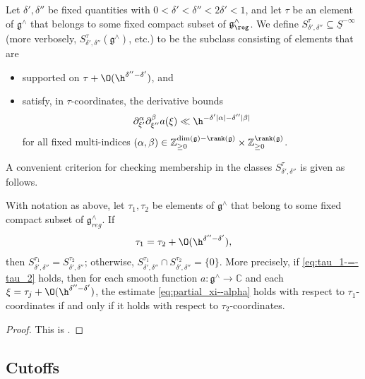 Let $\delta ', \delta ''$ be fixed quantities with $0 < \delta ' < \delta '' < 2 \delta ' < 1$, and let $\tau$ be an element of $\mathfrak{g}^\wedge$ that belongs to some fixed compact subset of $\mathfrak{g}^\wedge_{\reg}$.  We define $S^{\tau}_{\delta ', \delta ''} \subseteq \underline{S}^{-\infty}$ (more verbosely, $S_{\delta ', \delta ''}^{\tau}(\mathfrak{g}^\wedge)$, etc.) to be the subclass consisting of elements that are   
\begin{itemize}
\item supported on $\tau + \O(\h^{ \delta '' - \delta '})$, and
\item satisfy, in $\tau$-coordinates, the derivative bounds
  \begin{equation}\label{eq:partial_xi--alpha}
    \partial_{\xi '} ^{\alpha } \partial_{\xi ''} ^{\beta } a (\xi) \ll \h^{- \delta ' |\alpha| - \delta '' |\beta|}
  \end{equation}
  for all fixed multi-indices $(\alpha,\beta) \in \mathbb{Z}_{\geq 0}^{\dim(\mathfrak{g}) - \rank(\mathfrak{g})} \times \mathbb{Z}_{\geq 0}^{\rank(\mathfrak{g})}$.
\end{itemize}
A convenient criterion for checking membership in the classes $S^\tau_{\delta ', \delta ''}$ is given as follows.
\begin{lemma}\label{lem:basepoint-insensitivity}
  With notation as above, let $\tau_1, \tau_2$ be elements of $\mathfrak{g}^\wedge$ that belong to some fixed compact subset of $\mathfrak{g}^\wedge_{reg}$.  If
  \begin{equation}\label{eq:tau_1-=-tau_2}
    \tau_1 = \tau_2 + \O (\h^{\delta '' - \delta '}),
  \end{equation}
  then $S_{\delta ', \delta ''}^{\tau_1} = S_{\delta ', \delta ''}^{\tau_2}$; otherwise, $S^{\tau_1}_{\delta', \delta ''} \cap S^{\tau_2}_{\delta', \delta ''} = \{0\}$.  More precisely, if \eqref{eq:tau_1-=-tau_2} holds, then for each smooth function $a : \mathfrak{g}^\wedge \rightarrow \mathbb{C}$ and each $\xi = \tau_j + \O (\h^{\delta '' - \delta '})$, the estimate \eqref{eq:partial_xi--alpha} holds with respect to $\tau_1$-coordinates if and only if it holds with respect to $\tau_2$-coordinates.
\end{lemma}
\begin{proof}
  This is \cite[Lemma 9.9]{2020arXiv201202187N}.
\end{proof}

\subsection{Cutoffs}

